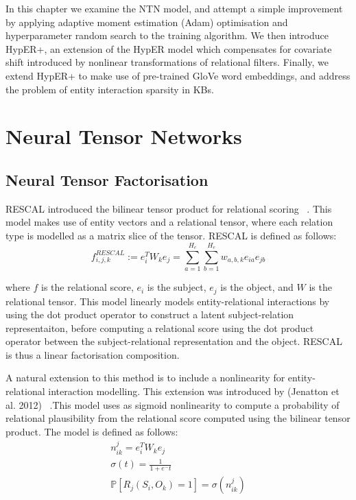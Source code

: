 \noindent In this chapter we examine the NTN model, and attempt a simple improvement by applying adaptive moment estimation (Adam) optimisation and hyperparameter random search to the training algorithm. We then introduce HypER+, an extension of the HypER model which compensates for covariate shift introduced by nonlinear transformations of relational filters. Finally, we extend HypER+ to make use of pre-trained GloVe word embeddings, and address the problem of entity interaction sparsity in KBs.



\section{Neural Tensor Networks}

\subsection{Neural Tensor Factorisation}
RESCAL introduced the bilinear tensor product for relational scoring \unskip ~\citep{nickel2011three}. This model makes use of entity vectors and a relational tensor, where each relation type is modelled as a matrix slice of the tensor. RESCAL is defined as follows:
\begin{equation}
	f_{i, j, k}^{RESCAL} := e_i^TW_ke_j = \sum_{a=1}^{H_e}\sum_{b=1}^{H_e}w_{a,b,k}e_{ia}e_{jb}
\end{equation}

\noindent where $f$ is the relational score, $e_i$ is the subject, $e_j$ is the object, and $W$ is the relational tensor. This model linearly models entity-relational interactions by using the dot product operator to construct a latent subject-relation representaiton, before computing a relational score using the dot product operator between the subject-relational representation and the object. RESCAL is thus a linear factorisation composition. \par

\noindent A natural extension to this method is to include a nonlinearity for entity-relational interaction modelling. This extension was introduced by (Jenatton et al. 2012) \unskip ~\citep{jenatton2012latent}.This model uses as sigmoid nonlinearity to compute a probability of relational plausibility from the relational score computed using the bilinear tensor product. The model is defined as follows:
\begin{subequations}
	\begin{gather}
		n_{ik}^{j} = e_i^TW_ke_j \\
		\sigma(t) = \frac{1}{1 + e^-t} \\
		\mathbb{P}\left [ R_j(S_i, O_k) = 1 \right ] = \sigma(n_{ik}^{j})
	\end{gather}
\end{subequations}

